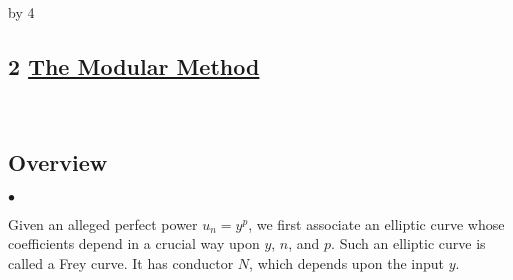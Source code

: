 \documentclass[12pt]{scrartcl}
\newenvironment{citemize}{
\begin{list}{$\bullet$}{\setlength{\itemsep}{0pt} \setlength{\rightmargin}{0pt} \setlength{\leftmargin}{0.5\labelwidth} \setlength{\topsep}{0pt}}
}{\end{list}}
\def\H{{\mathbb H}}
\def\Z{{\mathbb Z}}
\newcommand{\SL}{\text{SL}}
\def\anzspalten{4}
\newlength{\kastenwidth}
\newenvironment{kasten}{%
  \begin{lrbox}{\dummybox}%
    \begin{minipage}{0.96\linewidth}}%
    {\end{minipage}%
  \end{lrbox}%
  \raisebox{-\depth}{\psshadowbox[framesep=1em]{\usebox{\dummybox}}}\\[0.5em]}
\newenvironment{spalte}{%
  \setlength\kastenwidth{1.2\textwidth}
  \divide\kastenwidth by \anzspalten
  \begin{minipage}[t]{\kastenwidth}}{\end{minipage}\hfill}
\begin{document}
\begin{lrbox}{\spalten}
{\begin{spalte}






\begin{kasten}
\section*{2 \hspace{0.1cm} {\color{red} 
\underline{The Modular Method}}}
\end{kasten}

\begin{kasten}

\subsection*{\color{blue} Overview}

\begin{citemize}

\item Given an alleged perfect power $u_n = y^p$, we first associate an elliptic curve whose coefficients depend in a crucial way upon $y$, $n$, and $p$.  Such an elliptic curve is called a Frey curve.  It has conductor $N$, which depends upon the input $y$.


\end{citemize}
\end{kasten}
\end{spalte}}
\end{lrbox}
\end{document}
